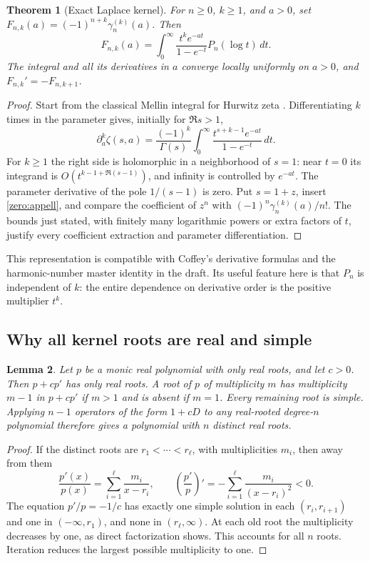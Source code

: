 \documentclass[11pt,a4paper]{article}
\newtheorem{theorem}{Theorem}[section]
\newtheorem{lemma}[theorem]{Lemma}
\theoremstyle{definition}
\theoremstyle{remark}
\numberwithin{equation}{section}
\begin{document}
\begin{theorem}[Exact Laplace kernel]\label{zero:kernel}
For $n\geq0$, $k\geq1$, and $a>0$, set
$F_{n,k}(a)=(-1)^{n+k}\gamma_n^{(k)}(a)$.  Then
\begin{equation}\label{zero:laplace}
 F_{n,k}(a)=\int_0^\infty
       \frac{t^k e^{-at}}{1-e^{-t}}P_n(\log t)\,dt.
\end{equation}
The integral and all its derivatives in $a$ converge locally uniformly
on $a>0$, and $F_{n,k}'=-F_{n,k+1}$.
\end{theorem}
\begin{proof}
Start from the classical Mellin integral for Hurwitz zeta
\cite{DLMF25}.  Differentiating $k$ times in the parameter gives, initially
for $\Re s>1$,
\[
 \partial_a^k\zeta(s,a)
   =\frac{(-1)^k}{\Gamma(s)}
      \int_0^\infty\frac{t^{s+k-1}e^{-at}}{1-e^{-t}}\,dt.
\]
For $k\geq1$ the right side is holomorphic in a neighborhood of $s=1$:
near $t=0$ its integrand is $O(t^{k-1+\Re(s-1)})$, and infinity is
controlled by $e^{-at}$.  The parameter derivative of the pole
$1/(s-1)$ is zero.  Put $s=1+z$, insert \eqref{zero:appell}, and
compare the coefficient of $z^n$ with
$(-1)^n\gamma_n^{(k)}(a)/n!$.  The bounds just stated, with finitely
many logarithmic powers or extra factors of $t$, justify every
coefficient extraction and parameter differentiation.
\end{proof}

This representation is compatible with Coffey's derivative formulas
\cite{Coffey2009} and the harmonic-number master identity in the draft.
Its useful feature here is that $P_n$ is independent of $k$: the entire
dependence on derivative order is the positive multiplier $t^k$.

\subsection{Why all kernel roots are real and simple}

\begin{lemma}\label{zero:root-preserver}
Let $p$ be a monic real polynomial with only real roots, and let $c>0$.
Then $p+cp'$ has only real roots.  A root of $p$ of multiplicity $m$
has multiplicity $m-1$ in $p+cp'$ if $m>1$ and is absent if $m=1$.
Every remaining root is simple.  Applying $n-1$ operators of the form
$1+cD$ to any real-rooted degree-$n$ polynomial therefore gives a
polynomial with $n$ distinct real roots.
\end{lemma}
\begin{proof}
If the distinct roots are $r_1<\cdots<r_\ell$, with multiplicities
$m_i$, then away from them
\[
 \frac{p'(x)}{p(x)}=\sum_{i=1}^{\ell}\frac{m_i}{x-r_i},
 \qquad
 \left(\frac{p'}p\right)'=-\sum_{i=1}^{\ell}
                                  \frac{m_i}{(x-r_i)^2}<0.
\]
The equation $p'/p=-1/c$ has exactly one simple solution in each
$(r_i,r_{i+1})$ and one in $(-\infty,r_1)$, and none in
$(r_\ell,\infty)$.  At each old root the multiplicity decreases
by one, as direct factorization shows.  This accounts for all $n$
roots.  Iteration reduces the largest possible multiplicity to one.
\end{proof}
\end{document}
